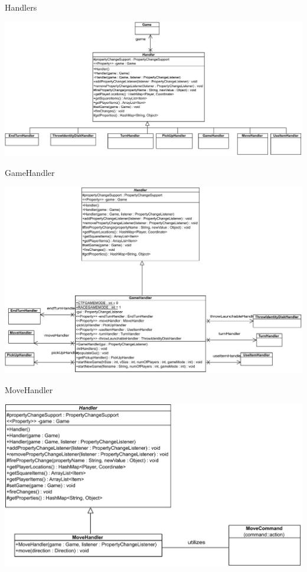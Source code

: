 \documentclass[11pt,t]{beamer}
\begin{document}
\begin{frame}{Handlers}
\begin{center}
\includegraphics[width=0.95\linewidth]{images/handlers}
\end{center}
\end{frame}

\begin{frame}{GameHandler}
\begin{center}
\includegraphics[scale=0.3]{images/gamehandler}
\end{center}
\end{frame}

\begin{frame}{MoveHandler}
\begin{center}
\includegraphics[scale=0.45]{images/movehandler}
\end{center}
\end{frame}
\end{document}
